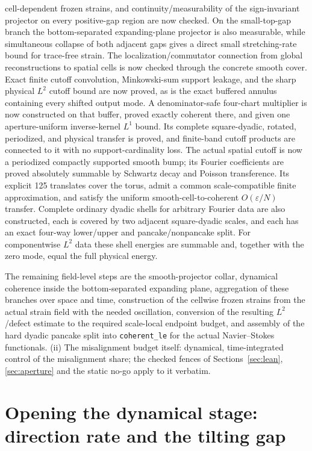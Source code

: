 \documentclass[11pt]{article}
\theoremstyle{definition}
\begin{document}
cell-dependent frozen strains, and continuity/measurability of the
sign-invariant projector on every positive-gap region are now checked.  On
the small-top-gap branch the bottom-separated expanding-plane projector is
also measurable, while simultaneous collapse of both adjacent gaps gives a
direct small stretching-rate bound for trace-free strain.  The
localization/commutator connection from global reconstructions to spatial
cells is now checked through the concrete smooth cover.  Exact finite cutoff convolution,
Minkowski-sum support leakage, and the sharp physical $L^2$ cutoff bound are
now proved, as is the exact buffered annulus containing every shifted output
mode.  A denominator-safe four-chart multiplier is now constructed on that
buffer, proved exactly coherent there, and given one aperture-uniform
inverse-kernel $L^1$ bound.  Its complete square-dyadic, rotated, periodized,
and physical transfer is proved, and finite-band cutoff products are connected
to it with no support-cardinality loss.  The actual spatial cutoff is now a
periodized compactly supported smooth bump; its Fourier coefficients are
proved absolutely summable by Schwartz decay and Poisson transference.  Its
explicit 125 translates cover the torus, admit a common scale-compatible
finite approximation, and satisfy the uniform smooth-cell-to-coherent
$O(\varepsilon/N)$ transfer.  Complete ordinary dyadic shells for arbitrary
Fourier data are also constructed, each is covered by two adjacent
square-dyadic scales, and each has an exact four-way lower/upper and
pancake/nonpancake split.  For componentwise $L^2$ data these shell energies
are summable and, together with the zero mode, equal the full physical energy.

The remaining field-level steps are the smooth-projector collar, dynamical
coherence inside the bottom-separated expanding plane, aggregation of these
branches over space and time, construction of the cellwise
frozen strains from the actual strain field with the needed oscillation,
conversion of the resulting
$L^2$/defect estimate to the required scale-local endpoint budget, and
assembly of the hard dyadic pancake split into
\texttt{coherent\_le} for the actual Navier--Stokes functionals.
(ii) The misalignment budget itself: dynamical,
time-integrated control of the misalignment share; the checked fences
of Sections~\ref{sec:lean}, \ref{sec:aperture} and the static no-go
apply to it verbatim.

\section{Opening the dynamical stage: direction rate and the tilting gap}
\label{sec:direction-dynamics}
\end{document}

